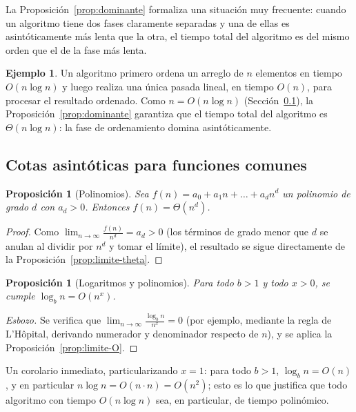\documentclass[12pt, spanish, oneside, openany]{book}
\theoremstyle{uprightplain}
\newtheorem{proposicion}[teorema]{Proposición}
\theoremstyle{definition}
\newtheorem{ejemplo}[teorema]{Ejemplo}
\theoremstyle{remark}
\theoremstyle{definition}
\begin{document}
La Proposición~\ref{prop:dominante} formaliza una situación muy frecuente: cuando un algoritmo tiene dos fases claramente separadas y una de ellas es asintóticamente más lenta que la otra, el tiempo total del algoritmo es del mismo orden que el de la fase más lenta.

\begin{ejemplo}
\label{ej:dominante}
Un algoritmo primero ordena un arreglo de $n$ elementos en tiempo $O(n\log n)$ y luego realiza una única pasada lineal, en tiempo $O(n)$, para procesar el resultado ordenado. Como $n=O(n\log n)$ (Sección~\ref{subsec:funciones-comunes}), la Proposición~\ref{prop:dominante} garantiza que el tiempo total del algoritmo es $\Theta(n\log n)$: la fase de ordenamiento domina asintóticamente.
\end{ejemplo}

\subsection{Cotas asintóticas para funciones comunes}
\label{subsec:funciones-comunes}

\begin{proposicion}[Polinomios]
\label{prop:polinomios}
Sea $f(n)=a_0+a_1n+\dots+a_dn^d$ un polinomio de grado $d$ con $a_d>0$. Entonces $f(n)=\Theta(n^d)$.
\end{proposicion}
\begin{proof}
Como $\displaystyle\lim_{n\to\infty}\frac{f(n)}{n^d}=a_d>0$ (los términos de grado menor que $d$ se anulan al dividir por $n^d$ y tomar el límite), el resultado se sigue directamente de la Proposición~\ref{prop:limite-theta}.
\end{proof}

\begin{proposicion}[Logaritmos y polinomios]
\label{prop:log-poli}
Para todo $b>1$ y todo $x>0$, se cumple $\log_b n = O(n^x)$.
\end{proposicion}
\begin{proof}[Esbozo]
Se verifica que $\displaystyle\lim_{n\to\infty}\frac{\log_b n}{n^x}=0$ (por ejemplo, mediante la regla de L'Hôpital, derivando numerador y denominador respecto de $n$), y se aplica la Proposición~\ref{prop:limite-O}.
\end{proof}

Un corolario inmediato, particularizando $x=1$: para todo $b>1$, $\log_b n = O(n)$, y en particular $n\log n = O(n\cdot n)=O(n^2)$; esto es lo que justifica que todo algoritmo con tiempo $O(n\log n)$ sea, en particular, de tiempo polinómico.
\end{document}
